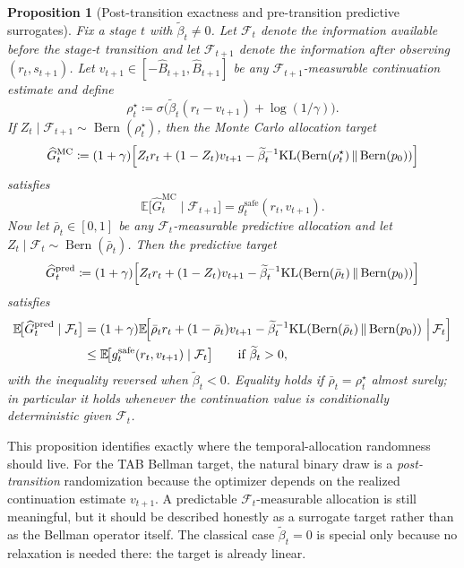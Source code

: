 \documentclass{article}
\newtheorem{proposition}[proposition]{Proposition}
\theoremstyle{remark}
\DeclareMathOperator{\Bern}{Bern}
\newcommand{\E}{\mathbb{E}}
\newcommand{\KL}{\mathrm{KL}}
\newcommand{\defeq}{\coloneqq}
\newcommand{\pprior}{p_0}
\newcommand{\KLbin}[2]{\KL\!\left(\Bern(#1)\,\middle\|\,\Bern(#2)\right)}
\newcommand{\safe}{\mathrm{safe}}
\newcommand{\Bhat}{\widehat B}
\begin{document}
\begin{proposition}[Post-transition exactness and pre-transition predictive surrogates]
\label{prop:mc-relaxation}
Fix a stage $t$ with $\widetilde\beta_t\neq 0$.
Let $\mathcal F_t$ denote the information available before the stage-$t$ transition and let $\mathcal F_{t+1}$ denote the information after observing $(r_t,s_{t+1})$.
Let $v_{t+1}\in[-\Bhat_{t+1},\Bhat_{t+1}]$ be any $\mathcal F_{t+1}$-measurable continuation estimate and define
\[
\rho_t^\star
\defeq
\sigma\!\bigl(\widetilde\beta_t(r_t-v_{t+1})+\log(1/\gamma)\bigr).
\]
If $Z_t\mid \mathcal F_{t+1}\sim \Bern(\rho_t^\star)$, then the Monte Carlo allocation target
\begin{equation}
\widehat G_t^{\mathrm{MC}}
\defeq
(1+\gamma)\Bigl[
Z_t r_t +(1-Z_t)v_{t+1}
-\widetilde\beta_t^{-1}\KLbin{\rho_t^\star}{\pprior}
\Bigr]
\label{eq:mc-target-post}
\end{equation}
satisfies
\begin{equation}
\E\!\bigl[\widehat G_t^{\mathrm{MC}}\mid \mathcal F_{t+1}\bigr]
=
g_t^{\safe}(r_t,v_{t+1}).
\label{eq:mc-target-post-unbiased}
\end{equation}
Now let $\bar\rho_t\in[0,1]$ be any $\mathcal F_t$-measurable predictive allocation and let $Z_t\mid \mathcal F_t\sim \Bern(\bar\rho_t)$.
Then the predictive target
\begin{equation}
\widehat G_t^{\mathrm{pred}}
\defeq
(1+\gamma)\Bigl[
Z_t r_t +(1-Z_t)v_{t+1}
-\widetilde\beta_t^{-1}\KLbin{\bar\rho_t}{\pprior}
\Bigr]
\label{eq:mc-target-pre}
\end{equation}
satisfies
\begin{align}
\E\!\bigl[\widehat G_t^{\mathrm{pred}}\mid \mathcal F_t\bigr]
&=
(1+\gamma)\E\!\Bigl[
\bar\rho_t r_t +(1-\bar\rho_t)v_{t+1}
-\widetilde\beta_t^{-1}\KLbin{\bar\rho_t}{\pprior}
\,\Big|\, \mathcal F_t
\Bigr]
\nonumber\\
&\le \E\!\bigl[g_t^{\safe}(r_t,v_{t+1})\mid \mathcal F_t\bigr]
\qquad \text{if } \widetilde\beta_t>0,
\label{eq:mc-target-pre-bound}
\end{align}
with the inequality reversed when $\widetilde\beta_t<0$.
Equality holds if $\bar\rho_t=\rho_t^\star$ almost surely; in particular it holds whenever the continuation value is conditionally deterministic given $\mathcal F_t$.
\end{proposition}

This proposition identifies exactly where the temporal-allocation randomness should live.
For the TAB Bellman target, the natural binary draw is a \emph{post-transition} randomization because the optimizer depends on the realized continuation estimate $v_{t+1}$.
A predictable $\mathcal F_t$-measurable allocation is still meaningful, but it should be described honestly as a surrogate target rather than as the Bellman operator itself.
The classical case $\widetilde\beta_t=0$ is special only because no relaxation is needed there: the target is already linear.
\end{document}
